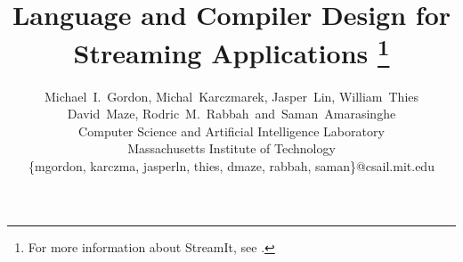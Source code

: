 \documentclass[10pt,twocolumn]{article}
\begin{document}
\title{Language and Compiler Design for Streaming Applications%
\thanks{For more information about StreamIt, see \streamiturl.}}

\author{Michael~I.~Gordon, Michal~Karczmarek, Jasper~Lin, William~Thies\\
 David~Maze, Rodric~M.~Rabbah~and~Saman~Amarasinghe\\
 Computer Science and Artificial Intelligence Laboratory\\
 Massachusetts Institute of Technology\\
 \{mgordon, karczma, jasperln, thies, dmaze, rabbah, saman\}@csail.mit.edu}

\maketitle

\newcommand{\makeline}[0]{\rule{0cm}{0cm}\\\hrule\rule{0cm}{0cm}}


\thispagestyle{empty}

\begin{abstract}

\end{abstract}







%
%
%









%
\end{document}
